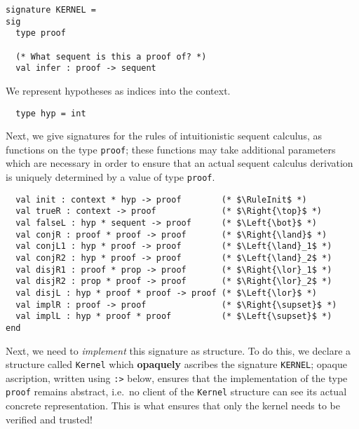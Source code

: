 \documentclass{article}
\newcommand\Right[1]{{#1}\mathsf{R}}
\newcommand\Left[1]{{#1}\mathsf{L}}
\newcommand\RuleInit{\mathsf{init}}
\theoremstyle{definition}
\theoremstyle{remark}
\begin{document}
\begin{verbatim}
signature KERNEL =
sig
  type proof

  (* What sequent is this a proof of? *)
  val infer : proof -> sequent
\end{verbatim}
We represent hypotheses as indices into the context.
\begin{verbatim}
  type hyp = int
\end{verbatim}
Next, we give signatures for the rules of intuitionistic sequent
calculus, as functions on the type \verb|proof|; these functions may
take additional parameters which are necessary in order to ensure that
an actual sequent calculus derivation is uniquely determined by a
value of type \verb|proof|.
\begin{verbatim}
  val init : context * hyp -> proof        (* $\RuleInit$ *)
  val trueR : context -> proof             (* $\Right{\top}$ *)
  val falseL : hyp * sequent -> proof      (* $\Left{\bot}$ *)
  val conjR : proof * proof -> proof       (* $\Right{\land}$ *)
  val conjL1 : hyp * proof -> proof        (* $\Left{\land}_1$ *)
  val conjR2 : hyp * proof -> proof        (* $\Left{\land}_2$ *)
  val disjR1 : proof * prop -> proof       (* $\Right{\lor}_1$ *)
  val disjR2 : prop * proof -> proof       (* $\Right{\lor}_2$ *)
  val disjL : hyp * proof * proof -> proof (* $\Left{\lor}$ *)
  val implR : proof -> proof               (* $\Right{\supset}$ *)
  val implL : hyp * proof * proof          (* $\Left{\supset}$ *)
end
\end{verbatim}

Next, we need to \emph{implement} this signature as structure. To do
this, we declare a structure called \verb|Kernel| which
\textbf{opaquely} ascribes the signature \verb|KERNEL|; opaque
ascription, written using \verb|:>| below, ensures that the
implementation of the type \verb|proof| remains abstract, i.e.\ no
client of the \verb|Kernel| structure can see its actual concrete
representation. This is what ensures that only the kernel needs to be
verified and trusted!
\end{document}
